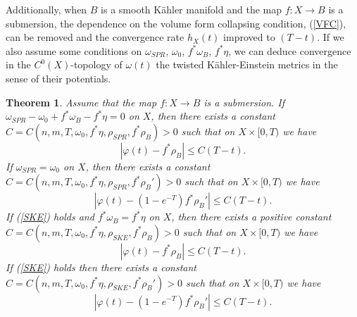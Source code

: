 \documentclass[12pt]{article}
\newtheorem{theorem}{Theorem}[section]
\numberwithin{equation}{section}
\begin{document}
\noindent Additionally, when $B$ is a smooth K\"ahler manifold and the map $f:X \to B$ is a submersion, the dependence on the volume form collapsing condition, (\ref{VFC}), can be removed and the convergence rate $h_X(t)$ improved to $(T-t)$. If we also assume some conditions on $\omega_{SPR}$, $\omega_0$, $f^*\omega_B$, $f^*\eta$, we can deduce convergence in the $C^0(X)$-topology of $\omega(t)$ the twisted K\"ahler-Einstein metrics in the sense of their potentials.

\begin{theorem}
Assume that the map $f: X \to B$ is a submersion. If $\omega_{SPR} - \omega_0 + f^*\omega_B - f^*\eta = 0$ on $X$, then there exists a constant $C = C(n,m,T,\omega_0,f^*\eta,\rho_{SPR},f^*\rho_B) > 0$ such that on $X \times [0,T)$ we have
\begin{equation*}
    \left|\varphi(t) - f^*\rho_B\right| \leq C(T-t).
\end{equation*}
If $\omega_{SPR} = \omega_{0}$ on $X$, then there exists a constant $C = C(n,m,T,\omega_0,f^*\eta, \rho_{SPR}, f^*\rho_B') > 0$ such that on $X \times [0,T)$ we have
\begin{equation*}
    \left|\varphi(t) - (1-e^{-T}) f^*\rho_B'\right| \leq C(T-t).
\end{equation*}
If (\ref{SKE}) holds and $f^*\omega_{B} = f^*\eta$ on $X$, then there exists a positive constant $C = C(n,m,T,\omega_0,f^*\eta,\rho_{SKE}, f^*\rho_B) > 0$ such that on $X \times [0,T)$ we have
\begin{equation*}
    \left|\varphi(t) - f^*\rho_B\right| \leq C(T-t).
\end{equation*}
If (\ref{SKE}) holds then there exists a constant $C = C(n,m,T,\omega_0,f^*\eta, \rho_{SKE},f^*\rho_B') > 0$ such that on $X \times [0,T)$ we have
\begin{equation*}
    \left|\varphi(t) - (1-e^{-T}) f^*\rho_B'\right| \leq C(T-t).
\end{equation*}
\end{theorem}
\end{document}
